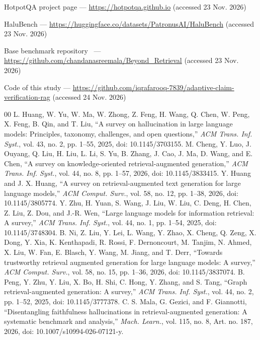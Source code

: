 \documentclass[conference]{IEEEtran}
\begin{document}
\textbullet{} HotpotQA project page --- \url{https://hotpotqa.github.io} (accessed 23 Nov. 2026)

\textbullet{} HaluBench --- \url{https://huggingface.co/datasets/PatronusAI/HaluBench} (accessed 23 Nov. 2026)

\textbullet{} Base benchmark repository~\cite{mala_ml} --- \url{https://github.com/chandanasreemala/Beyond_Retrieval} (accessed 23 Nov. 2026)

\textbullet{} Code of this study --- \url{https://github.com/iqrafarooq-7839/adaptive-claim-verification-rag} (accessed 24 Nov. 2026)

\begin{thebibliography}{00}
 L. Huang, W. Yu, W. Ma, W. Zhong, Z. Feng, H. Wang, Q. Chen, W. Peng, X. Feng, B. Qin, and T. Liu, ``A survey on hallucination in large language models: Principles, taxonomy, challenges, and open questions,'' \textit{ACM Trans. Inf. Syst.}, vol. 43, no. 2, pp. 1--55, 2025, doi: 10.1145/3703155.
 M. Cheng, Y. Luo, J. Ouyang, Q. Liu, H. Liu, L. Li, S. Yu, B. Zhang, J. Cao, J. Ma, D. Wang, and E. Chen, ``A survey on knowledge-oriented retrieval-augmented generation,'' \textit{ACM Trans. Inf. Syst.}, vol. 44, no. 8, pp. 1--57, 2026, doi: 10.1145/3833415.
 Y. Huang and J. X. Huang, ``A survey on retrieval-augmented text generation for large language models,'' \textit{ACM Comput. Surv.}, vol. 58, no. 12, pp. 1--38, 2026, doi: 10.1145/3805774.
 Y. Zhu, H. Yuan, S. Wang, J. Liu, W. Liu, C. Deng, H. Chen, Z. Liu, Z. Dou, and J.-R. Wen, ``Large language models for information retrieval: A survey,'' \textit{ACM Trans. Inf. Syst.}, vol. 44, no. 1, pp. 1--54, 2025, doi: 10.1145/3748304.
 B. Ni, Z. Liu, Y. Lei, L. Wang, Y. Zhao, X. Cheng, Q. Zeng, X. Dong, Y. Xia, K. Kenthapadi, R. Rossi, F. Dernoncourt, M. Tanjim, N. Ahmed, X. Liu, W. Fan, E. Blasch, Y. Wang, M. Jiang, and T. Derr, ``Towards trustworthy retrieval augmented generation for large language models: A survey,'' \textit{ACM Comput. Surv.}, vol. 58, no. 15, pp. 1--36, 2026, doi: 10.1145/3837074.
 B. Peng, Y. Zhu, Y. Liu, X. Bo, H. Shi, C. Hong, Y. Zhang, and S. Tang, ``Graph retrieval-augmented generation: A survey,'' \textit{ACM Trans. Inf. Syst.}, vol. 44, no. 2, pp. 1--52, 2025, doi: 10.1145/3777378.
 C. S. Mala, G. Gezici, and F. Giannotti, ``Disentangling faithfulness hallucinations in retrieval-augmented generation: A systematic benchmark and analysis,'' \textit{Mach. Learn.}, vol. 115, no. 8, Art. no. 187, 2026, doi: 10.1007/s10994-026-07121-y.

\end{thebibliography}
\end{document}
